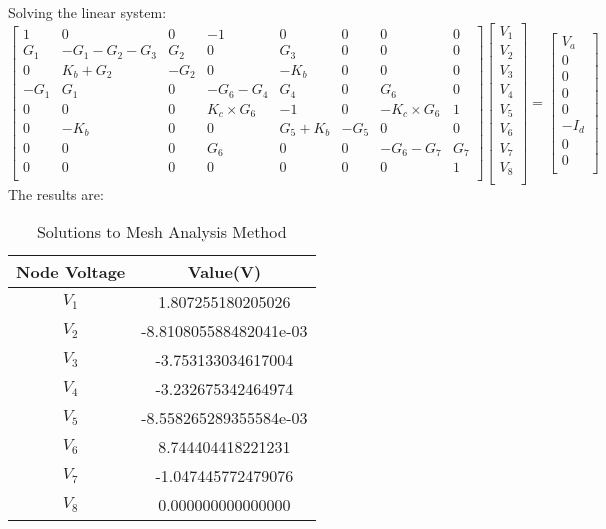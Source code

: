 Solving the linear system:
$$
\begin{bmatrix}
1  &  0 & 0 & -1 & 0 & 0 & 0 & 0       \\
G_1 & -G_1-G_2-G_3 & G_2 & 0 & G_3 & 0 & 0 & 0      \\
0 & K_b+G_2 & -G_2 & 0 & -K_b & 0 & 0 & 0\\
-G_1 & G_1 & 0  & -G_6-G_4 & G_4 & 0 & G_6 & 0      \\
0 & 0 & 0 & K_c \times G_6 & -1 & 0 & -K_c \times G_6 & 1 \\
0 & -K_b & 0 & 0 & G_5+K_b & -G_5 & 0 & 0 \\
0&0&0&G_6&0&0&-G_6-G_7&G_7\\
0 & 0 & 0 & 0 & 0 & 0 & 0 & 1\\
\end{bmatrix}
\begin{bmatrix}
V_1     \\
V_2    \\
V_3   \\
V_4     \\
V_5     \\
V_6     \\
V_7     \\
V_8     \\
\end{bmatrix}
=
\begin{bmatrix}
V_a   \\
0    \\
0  \\
0  \\
0  \\
-I_d   \\
0  \\
0  \\
\end{bmatrix}
\quad
$$
The results are:

\begin{table}[h]


\label{tab:tables}
\begin{center}
\begin{tabular}{|c|c|}
 \hline

  Node Voltage & Value\hspace{1mm}(V)\\
 \hline
 $V_{1}$ & 1.807255180205026 \\
  \hline
 $V_{2}$ & -8.810805588482041e-03\\
  \hline
 $V_{3}$ & -3.753133034617004\\
  \hline
 $V_{4}$ & -3.232675342464974\\
  \hline
 $V_{5}$ & -8.558265289355584e-03\\
  \hline
 $V_{6}$ & 8.744404418221231\\
  \hline
 $V_{7}$ & -1.047445772479076\\
  \hline
 $V_{8}$ & 0.000000000000000 \\


 \hline
\end{tabular}
\caption{Solutions to Mesh Analysis Method}
\label{table:tab2}
\end{center}
\end{table}

